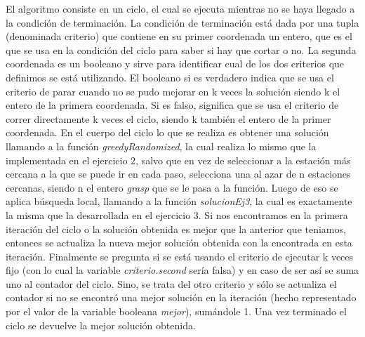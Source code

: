         El algoritmo consiste en un ciclo, el cual se ejecuta mientras no se haya llegado a la condición de terminación. La condición de terminación está dada por una tupla (denominada criterio) que contiene en su primer coordenada un entero, que es el que se usa en la condición del ciclo para saber si hay que cortar o no. La segunda coordenada es un booleano y sirve para identificar cual de los dos criterios que definimos se está utilizando. El booleano si es verdadero indica que se usa el criterio de parar cuando no se pudo mejorar en k veces la solución siendo k el entero de la primera coordenada. Si es falso, significa que se usa el criterio de correr directamente k veces el ciclo, siendo k también el entero de la primer coordenada.
        En el cuerpo del ciclo lo que se realiza es obtener una solución llamando a la función \textit{greedyRandomized}, la cual realiza lo mismo que la implementada en el ejercicio 2, salvo que en vez de seleccionar a la estación más cercana a la que se puede ir en cada paso, selecciona una al azar de n estaciones cercanas, siendo n el entero \textit{grasp} que se le pasa a la función. Luego de eso se aplica búsqueda local, llamando a la función \textit{solucionEj3}, la cual es exactamente la misma que la desarrollada en el ejercicio 3. Si nos encontramos en la primera iteración del ciclo o la solución obtenida es mejor que la anterior que teniamos, entonces se actualiza la nueva mejor solución obtenida con la encontrada en esta iteración.
        Finalmente se pregunta si se está usando el criterio de ejecutar k veces fijo (con lo cual la variable \textit{criterio.second} sería falsa) y en caso de ser así se suma uno al contador del ciclo. Sino, se trata del otro criterio y sólo se actualiza el contador si no se encontró una mejor solución en la iteración (hecho representado por el valor de la variable booleana \textit{mejor}), sumándole 1.
        Una vez terminado el ciclo se devuelve la mejor solución obtenida.